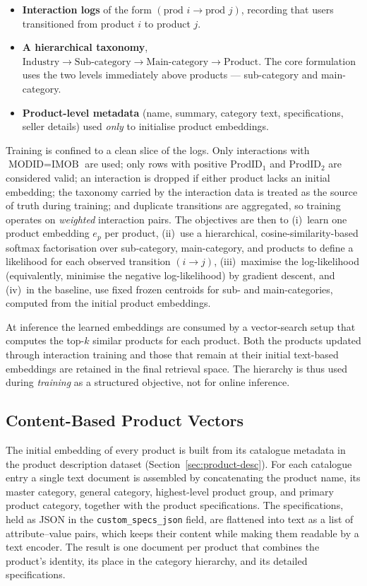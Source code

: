 \begin{itemize}
  \item \textbf{Interaction logs} of the form $(\text{prod } i \to
        \text{prod } j)$, recording that users transitioned from product $i$ to
        product $j$.
  \item \textbf{A hierarchical taxonomy},
        $\text{Industry} \to \text{Sub-category} \to \text{Main-category} \to
        \text{Product}$. The core formulation uses the two levels immediately
        above products --- sub-category and main-category.
  \item \textbf{Product-level metadata} (name, summary, category text,
        specifications, seller details) used \emph{only} to initialise product
        embeddings.
\end{itemize}

Training is confined to a clean slice of the logs. Only interactions with
$\text{MODID}=\text{IMOB}$ are used; only rows with positive $\text{ProdID}_1$
and $\text{ProdID}_2$ are considered valid; an interaction is dropped if either
product lacks an initial embedding; the taxonomy carried by the interaction
data is treated as the source of truth during training; and duplicate
transitions are aggregated, so training operates on \emph{weighted} interaction
pairs. The objectives are then to (i)~learn one product embedding $e_p$ per
product, (ii)~use a hierarchical, cosine-similarity-based softmax factorisation
over sub-category, main-category, and products to define a likelihood for each
observed transition $(i\to j)$, (iii)~maximise the log-likelihood
(equivalently, minimise the negative log-likelihood) by gradient descent, and
(iv)~in the baseline, use fixed frozen centroids for sub- and main-categories,
computed from the initial product embeddings.

At inference the learned embeddings are consumed by a vector-search setup that
computes the top-$k$ similar products for each product. Both the products
updated through interaction training and those that remain at their initial
text-based embeddings are retained in the final retrieval space. The hierarchy
is thus used during \emph{training} as a structured objective, not for online
inference.

\subsection{Content-Based Product Vectors}
\label{sec:emb-content-init}
The initial embedding of every product is built from its catalogue metadata in
the product description dataset (Section~\ref{sec:product-desc}). For each
catalogue entry a single text document is assembled by concatenating the product
name, its master category, general category, highest-level product group, and
primary product category, together with the product specifications. The
specifications, held as JSON in the \texttt{custom\_specs\_json} field, are
flattened into text as a list of attribute--value pairs, which keeps their
content while making them readable by a text encoder. The result is one document
per product that combines the product's identity, its place in the category
hierarchy, and its detailed specifications.

